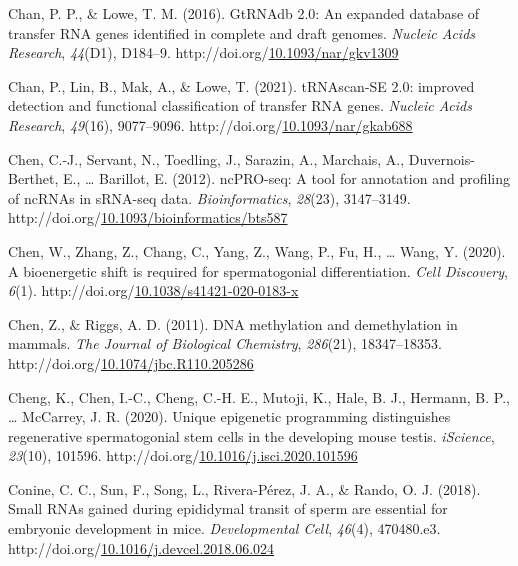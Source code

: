 \documentclass[12pt,twoside]{reedthesis}
\newlength{\cslhangindent}
\newenvironment{CSLReferences}[2] %
 {%
  \setlength{\parindent}{0pt}
  \ifodd #1 \everypar{\setlength{\hangindent}{\cslhangindent}}\ignorespaces\fi
  \ifnum #2 > 0
  \setlength{\parskip}{#2\baselineskip}
  \fi
 }%
 {}
\begin{document}
\begin{CSLReferences}{1}{0}
\leavevmode{}%
Chan, P. P., \& Lowe, T. M. (2016). GtRNAdb 2.0: An expanded database of transfer RNA genes identified in complete and draft genomes. \emph{Nucleic Acids Research}, \emph{44}(D1), D184--9. http://doi.org/\href{https://doi.org/10.1093/nar/gkv1309}{10.1093/nar/gkv1309}

\leavevmode{}%
Chan, P., Lin, B., Mak, A., \& Lowe, T. (2021). tRNAscan-SE 2.0: improved detection and functional classification of transfer RNA genes. \emph{Nucleic Acids Research}, \emph{49}(16), 9077--9096. http://doi.org/\href{https://doi.org/10.1093/nar/gkab688}{10.1093/nar/gkab688}

\leavevmode{}%
Chen, C.-J., Servant, N., Toedling, J., Sarazin, A., Marchais, A., Duvernois-Berthet, E., \ldots{} Barillot, E. (2012). ncPRO-seq: A tool for annotation and profiling of ncRNAs in sRNA-seq data. \emph{Bioinformatics}, \emph{28}(23), 3147--3149. http://doi.org/\href{https://doi.org/10.1093/bioinformatics/bts587}{10.1093/bioinformatics/bts587}

\leavevmode{}%
Chen, W., Zhang, Z., Chang, C., Yang, Z., Wang, P., Fu, H., \ldots{} Wang, Y. (2020). A bioenergetic shift is required for spermatogonial differentiation. \emph{Cell Discovery}, \emph{6}(1). http://doi.org/\href{https://doi.org/10.1038/s41421-020-0183-x}{10.1038/s41421-020-0183-x}

\leavevmode{}%
Chen, Z., \& Riggs, A. D. (2011). DNA methylation and demethylation in mammals. \emph{The Journal of Biological Chemistry}, \emph{286}(21), 18347--18353. http://doi.org/\href{https://doi.org/10.1074/jbc.R110.205286}{10.1074/jbc.R110.205286}

\leavevmode{}%
Cheng, K., Chen, I.-C., Cheng, C.-H. E., Mutoji, K., Hale, B. J., Hermann, B. P., \ldots{} McCarrey, J. R. (2020). Unique epigenetic programming distinguishes regenerative spermatogonial stem cells in the developing mouse testis. \emph{iScience}, \emph{23}(10), 101596. http://doi.org/\href{https://doi.org/10.1016/j.isci.2020.101596}{10.1016/j.isci.2020.101596}

\leavevmode{}%
Conine, C. C., Sun, F., Song, L., Rivera-Pérez, J. A., \& Rando, O. J. (2018). Small RNAs gained during epididymal transit of sperm are essential for embryonic development in mice. \emph{Developmental Cell}, \emph{46}(4), 470480.e3. http://doi.org/\href{https://doi.org/10.1016/j.devcel.2018.06.024}{10.1016/j.devcel.2018.06.024}


\end{CSLReferences}
\end{document}
